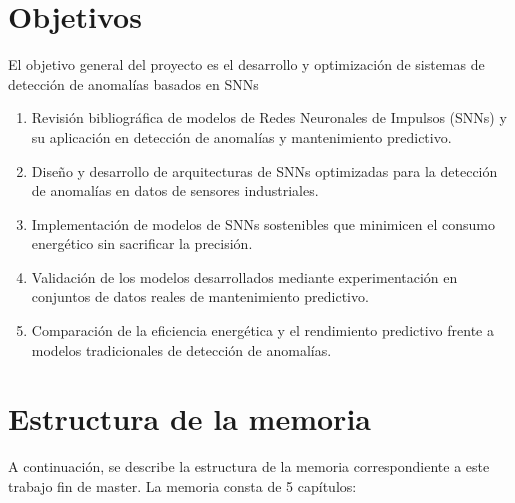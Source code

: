 \section{Objetivos}

El objetivo general del proyecto es el desarrollo y optimización de sistemas de detección de anomalías basados en SNNs

\begin{enumerate}
    \item Revisión bibliográfica de modelos de Redes Neuronales de Impulsos (SNNs) y su aplicación en detección de anomalías y mantenimiento predictivo.
    \item Diseño y desarrollo de arquitecturas de SNNs optimizadas para la detección de anomalías en datos de sensores industriales.
    \item Implementación de modelos de SNNs sostenibles que minimicen el consumo energético sin sacrificar la precisión.
    \item Validación de los modelos desarrollados mediante experimentación en conjuntos de datos reales de mantenimiento predictivo.
    \item Comparación de la eficiencia energética y el rendimiento predictivo frente a modelos tradicionales de detección de anomalías.
\end{enumerate}


\section{Estructura de la memoria}


A continuación, se describe la estructura de la memoria correspondiente a este trabajo fin de master. La memoria consta de 5 capítulos:

